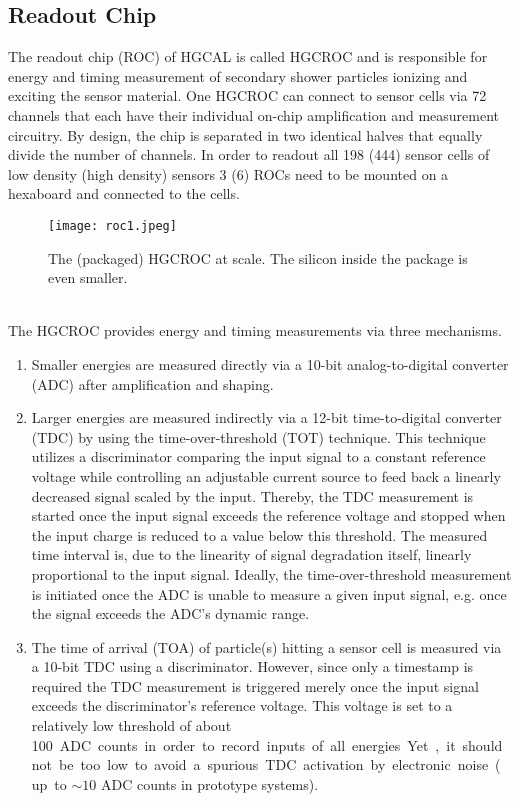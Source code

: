 \documentclass[../../main.tex]{subfiles}
\begin{document}
\subsection{Readout Chip}\label{sec:roc}
The readout chip (ROC) of HGCAL is called HGCROC and is responsible for energy and timing measurement of secondary shower particles ionizing and exciting the sensor material. One HGCROC can connect to sensor cells via 72 channels that each have their individual on-chip amplification and measurement circuitry. By design, the chip is separated in two identical halves that equally divide the number of channels. In order to readout all 198 (444) sensor cells of low density (high density) sensors 3 (6) ROCs need to be mounted on a hexaboard and connected to the cells.
\begin{figure}[htp]
	\begin{center}
		\texttt{[image: roc1.jpeg]}
		\caption{The (packaged) HGCROC at scale. The silicon inside the package is even smaller.}
		\label{fig:roc}
	\end{center}
\end{figure}
\\
The HGCROC provides energy and timing measurements via three mechanisms.
\begin{enumerate}
	\item Smaller energies are measured directly via a 10-bit analog-to-digital converter (ADC) after amplification and shaping. 
	\item Larger energies are measured indirectly via a 12-bit time-to-digital converter (TDC) by using the time-over-threshold (TOT) technique. This technique utilizes a discriminator comparing the input signal to a constant reference voltage while controlling an adjustable current source to feed back a linearly decreased signal scaled by the input. Thereby, the TDC measurement is started once the input signal exceeds the reference voltage and stopped when the input charge is reduced to a value below this threshold. The measured time interval is, due to the linearity of signal degradation itself, linearly proportional to the input signal. Ideally, the time-over-threshold measurement is initiated once the ADC is unable to measure a given input signal, e.g. once the signal exceeds the ADC's dynamic range.
	\item The time of arrival (TOA) of particle(s) hitting a sensor cell is measured via a 10-bit TDC using a discriminator. However, since only a timestamp is required the TDC measurement is triggered merely once the input signal exceeds the discriminator's reference voltage. This voltage is set to a relatively low threshold of about \SI{100} ADC counts in order to record inputs of all energies. Yet, it should not be too low to avoid a spurious TDC activation by electronic noise (up to $\sim10$ ADC counts in prototype systems).
\end{enumerate}
\end{document}
